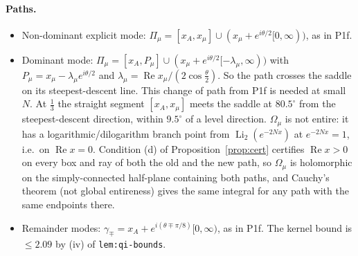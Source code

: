 \documentclass[11pt]{article}
\theoremstyle{remark}\newtheorem{remark}[theorem]{Remark}
\begin{document}
\paragraph{Paths.}
\begin{itemize}
\item Non-dominant explicit mode: $\Pi_\mu=[x_A,x_\mu]\cup(x_\mu+e^{i\theta/2}[0,\infty))$, as in P1f.
\item Dominant mode: $\Pi_\mu=[x_A,P_\mu]\cup(x_\mu+e^{i\theta/2}[-\lambda_\mu,\infty))$ with $P_\mu=x_\mu-\lambda_\mu e^{i\theta/2}$ and $\lambda_\mu=\operatorname{Re}x_\mu/(2\cos\frac\theta2)$. So the path crosses the saddle on its steepest-descent line.
 This change of path from P1f is needed at small $N$. At $\frac13$ the straight segment $[x_A,x_\mu]$ meets the saddle at $80.5^\circ$ from the steepest-descent direction, within $9.5^\circ$ of a level direction. $\Omega_\mu$ is not entire: it has a logarithmic/dilogarithm branch point from $\operatorname{Li}_2(e^{-2Nx})$ at $e^{-2Nx}=1$, i.e.\ on $\operatorname{Re}x=0$. Condition (d) of Proposition~\ref{prop:cert} certifies $\operatorname{Re}x>0$ on every box and ray of both the old and the new path, so $\Omega_\mu$ is holomorphic on the simply-connected half-plane containing both paths, and Cauchy's theorem (not global entireness) gives the same integral for any path with the same endpoints there.
\item Remainder modes: $\gamma_\mp=x_A+e^{i(\theta\mp\pi/8)}[0,\infty)$, as in P1f. The kernel bound is $\le2.09$ by (iv) of \texttt{lem:qi-bounds}.
\end{itemize}
\end{document}
